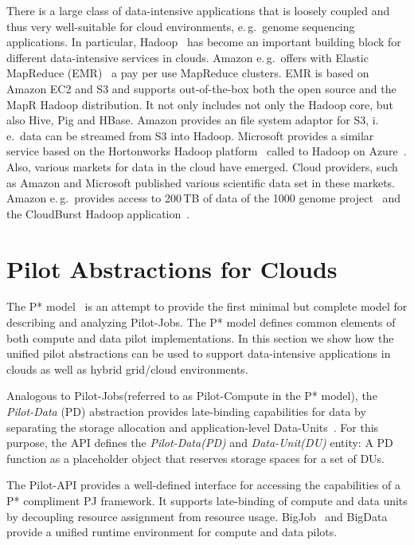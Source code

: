 \documentclass[times]{cpeauth}
\newcommand{\pilot}{Pilot\xspace}
\newcommand{\pilotjobs}{Pilot-Jobs\xspace}
\newcommand{\pilotcompute}{Pilot-Compute\xspace}
\newcommand{\pilotdata}{Pilot-Data\xspace}
\newcommand{\pd}{PD\xspace}
\newcommand{\dataunit}{Data-Unit\xspace}
\newcommand{\dataunits}{Data-Units\xspace}
\newcommand{\dus}{DUs\xspace}
\begin{document}
There is a large class of data-intensive applications that is loosely coupled
and thus very well-suitable for cloud environments, e.\,g.\ genome sequencing
applications. In particular, Hadoop~\cite{hadoop} has become an important
building block for different data-intensive services in clouds. Amazon e.\,g.\
offers with Elastic MapReduce (EMR)~\cite{amazonemr} a pay per use MapReduce
clusters. EMR is based on Amazon EC2 and S3 and supports out-of-the-box both
the open source and the MapR Hadoop distribution. It not only includes not
only the Hadoop core, but also Hive, Pig and HBase. Amazon provides an file
system adaptor for S3, i.\,e.\ data can be streamed from S3 into Hadoop.
Microsoft provides a similar service based on the Hortonworks Hadoop
platform~\cite{hortonworks} called to Hadoop on Azure~\cite{hadooponazure}.
Also, various markets for data in the cloud have emerged. Cloud providers,
such as Amazon and Microsoft published various scientific data set in these
markets. Amazon e.\,g.\ provides access to 200\,TB of data of the 1000 genome
project~\cite{amazon-1000genomes} and the CloudBurst Hadoop 
application~\cite{schatz2009}.



\section{Pilot Abstractions for Clouds}

The P* model~\cite{pstar12} is an attempt to provide the first minimal but
complete model for describing and analyzing \pilotjobs. The P* model defines
common elements of both compute and data pilot implementations. In this 
section we show how the unified pilot abstractions can be used to support 
data-intensive applications in clouds as well as hybrid grid/cloud 
environments.

Analogous to \pilotjobs (referred to as \pilotcompute in the P* model), the
{\it Pilot-Data} (PD) abstraction provides late-binding capabilities for data
by separating the storage allocation and application-level
\dataunits~\cite{pstar12}. For this purpose, the API defines the {\it
\pilotdata (PD)} and {\it \dataunit (DU)} entity: A \pd function as a
placeholder object that reserves storage spaces for a set of \dus. 

The \pilot-API provides a well-defined interface for accessing the
capabilities of a P* compliment PJ framework. It supports late-binding of
compute and data units by decoupling resource assignment from resource usage.
BigJob~\cite{saga_bigjob_condor_cloud} and 
BigData~\cite{Mantha:2012:PEF:2287016.2287020} provide a unified runtime 
environment for compute and data pilots.
\end{document}
